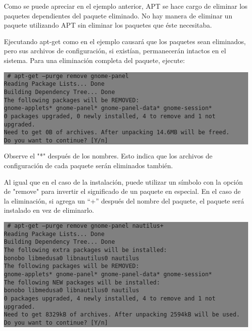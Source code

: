 \documentclass[12pt]{article}
\begin{document}
Como se puede apreciar en el ejemplo anterior, APT se hace cargo de eliminar los paquetes dependientes del paquete eliminado. No hay manera de eliminar un paquete utilizando APT sin eliminar los paquetes que éste necesitaba.

Ejecutando apt-get como en el ejemplo causará que los paquetes sean eliminados, pero sus archivos de configuración, si existían, permanecerán intactos en el sistema. Para una eliminación completa del paquete, ejecute:

\colorbox{grey}{\parbox[t]{0.95\linewidth}{ \vspace*{0.5cm} {\tt
     \# apt-get --purge remove gnome-panel\\
     Reading Package Lists... Done\\
     Building Dependency Tree... Done\\
     The following packages will be REMOVED:\\
       gnome-applets* gnome-panel* gnome-panel-data* gnome-session*\\
     0 packages upgraded, 0 newly installed, 4 to remove and 1 not upgraded.\\
     Need to get 0B of archives. After unpacking 14.6MB will be freed.\\
     Do you want to continue? [Y/n]\\
 } \vspace*{0.5cm} } } 

Observe el "*" después de los nombres. Esto indica que los archivos de configuración de cada paquete serán eliminados también.

Al igual que en el caso de la instalación, puede utilizar un símbolo con la opción de "remove" para invertir el significado de un paquete en especial. En el caso de la eliminación, si agrega un ``+'' después del nombre del paquete, el paquete será instalado en vez de eliminarlo.

\colorbox{grey}{\parbox[t]{0.95\linewidth}{ \vspace*{0.5cm} {\tt
     \# apt-get --purge remove gnome-panel nautilus+\\
     Reading Package Lists... Done\\
     Building Dependency Tree... Done\\
     The following extra packages will be installed:\\
       bonobo libmedusa0 libnautilus0 nautilus\\
     The following packages will be REMOVED:\\
       gnome-applets* gnome-panel* gnome-panel-data* gnome-session*\\
     The following NEW packages will be installed:\\
       bonobo libmedusa0 libnautilus0 nautilus\\
     0 packages upgraded, 4 newly installed, 4 to remove and 1 not upgraded.\\
     Need to get 8329kB of archives. After unpacking 2594kB will be used.\\
     Do you want to continue? [Y/n]\\
 } \vspace*{0.5cm} } } 
\end{document}
